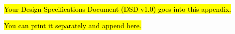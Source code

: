 \hl{Your Design Specifications Document (DSD v1.0) goes into this appendix.}

\hl{You can print it separately and append here.}

